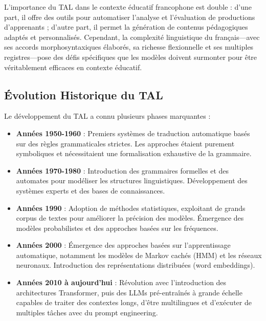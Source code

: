 L'importance du TAL dans le contexte éducatif francophone est double : d'une part, il offre des outils pour automatiser l'analyse et l'évaluation de productions d'apprenants ; d'autre part, il permet la génération de contenus pédagogiques adaptés et personnalisés. Cependant, la complexité linguistique du français—avec ses accords morphosyntaxiques élaborés, sa richesse flexionnelle et ses multiples registres—pose des défis spécifiques que les modèles doivent surmonter pour être véritablement efficaces en contexte éducatif.

\subsection{Évolution Historique du TAL}

Le développement du TAL a connu plusieurs phases marquantes :

\begin{itemize}
    \item \textbf{Années 1950-1960} : Premiers systèmes de traduction automatique basés sur des règles grammaticales strictes. Les approches étaient purement symboliques et nécessitaient une formalisation exhaustive de la grammaire.
    
    \item \textbf{Années 1970-1980} : Introduction des grammaires formelles et des automates pour modéliser les structures linguistiques. Développement des systèmes experts et des bases de connaissances.
    
    \item \textbf{Années 1990} : Adoption de méthodes statistiques, exploitant de grands corpus de textes pour améliorer la précision des modèles. Émergence des modèles probabilistes et des approches basées sur les fréquences.
    
    \item \textbf{Années 2000} : Émergence des approches basées sur l'apprentissage automatique, notamment les modèles de Markov cachés (HMM) et les réseaux neuronaux. Introduction des représentations distribuées (word embeddings).
    
    \item \textbf{Années 2010 à aujourd'hui} : Révolution avec l'introduction des architectures Transformer, puis des LLMs pré-entraînés à grande échelle capables de traiter des contextes longs, d’être multilingues et d’exécuter de multiples tâches avec du prompt engineering.
\end{itemize}


